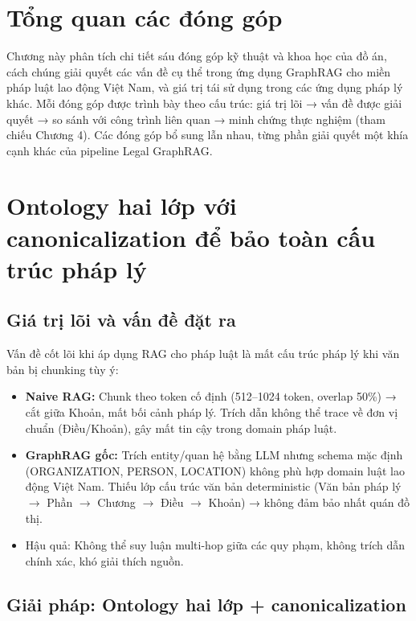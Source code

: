 \documentclass[../DoAn.tex]{subfiles}
\begin{document}
\section{Tổng quan các đóng góp}
\label{section:5.0}

Chương này phân tích chi tiết sáu đóng góp kỹ thuật và khoa học của đồ án, cách chúng giải quyết các vấn đề cụ thể trong ứng dụng \gls{GraphRAG} cho miền pháp luật lao động Việt Nam, và giá trị tái sử dụng trong các ứng dụng pháp lý khác. Mỗi đóng góp được trình bày theo cấu trúc: giá trị lõi → vấn đề được giải quyết → so sánh với công trình liên quan → minh chứng thực nghiệm (tham chiếu Chương 4). Các đóng góp bổ sung lẫn nhau, từng phần giải quyết một khía cạnh khác của pipeline Legal GraphRAG.

\section{Ontology hai lớp với canonicalization để bảo toàn cấu trúc pháp lý}
\label{section:5.1}

\subsection{Giá trị lõi và vấn đề đặt ra}
\label{subsection:5.1.1}

Vấn đề cốt lõi khi áp dụng \gls{RAG} cho pháp luật là mất cấu trúc pháp lý khi văn bản bị chunking tùy ý:

\begin{itemize}[nosep, leftmargin=*]
    \item \textbf{Naive RAG:} Chunk theo token cố định (512--1024 token, overlap 50\%) → cắt giữa Khoản, mất bối cảnh pháp lý. Trích dẫn không thể trace về đơn vị chuẩn (Điều/Khoản), gây mất tin cậy trong domain pháp luật.
    
    \item \textbf{GraphRAG gốc:} Trích entity/quan hệ bằng LLM nhưng schema mặc định (ORGANIZATION, PERSON, LOCATION) không phù hợp domain luật lao động Việt Nam. Thiếu lớp cấu trúc văn bản deterministic (Văn bản pháp lý $\rightarrow$ Phần $\rightarrow$ Chương $\rightarrow$ Điều $\rightarrow$ Khoản) → không đảm bảo nhất quán đồ thị.
    
    \item Hậu quả: Không thể suy luận multi-hop giữa các quy phạm, không trích dẫn chính xác, khó giải thích nguồn.
\end{itemize}

\subsection{Giải pháp: Ontology hai lớp + canonicalization}
\label{subsection:5.1.2}
\end{document}
